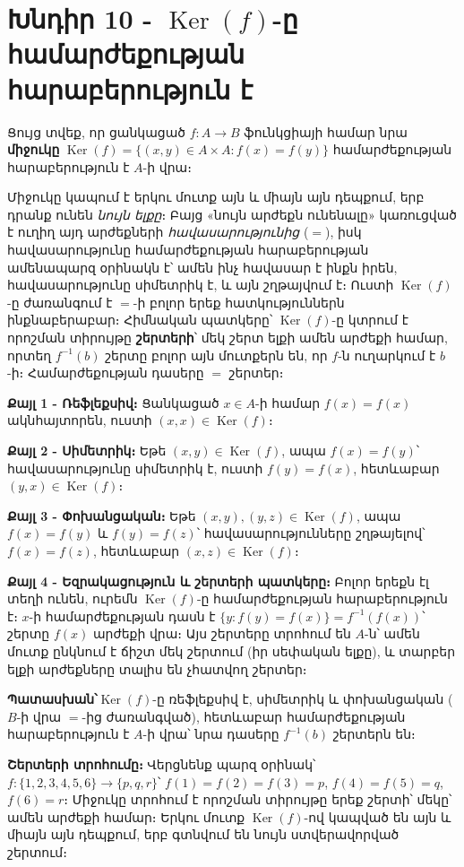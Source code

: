 \documentclass[11pt,a4paper]{article}
\DeclareMathOperator{\Ker}{Ker}
\newcommand{\answer}[1]{\begin{answerbox}\centering\textbf{Պատասխան՝}\quad #1\end{answerbox}}
\begin{document}
\section*{Խնդիր 10 - $\Ker(f)$-ը համարժեքության հարաբերություն է}

\begin{problembox}[10]
Ցույց տվեք, որ ցանկացած $f:A\to B$ ֆունկցիայի համար նրա \textbf{միջուկը}
$\Ker(f)=\{(x,y)\in A\times A: f(x)=f(y)\}$ համարժեքության հարաբերություն է $A$-ի վրա։
\end{problembox}

\begin{ideabox}
Միջուկը կապում է երկու մուտք այն և միայն այն դեպքում, երբ դրանք ունեն \emph{նույն ելքը}։ Բայց «նույն
արժեքն ունենալը» կառուցված է ուղիղ այդ արժեքների \emph{հավասարությունից} ($=$), իսկ հավասարությունը
համարժեքության հարաբերության ամենապարզ օրինակն է՝ ամեն ինչ հավասար է ինքն իրեն, հավասարությունը
սիմետրիկ է, և այն շղթայվում է։ Ուստի $\Ker(f)$-ը ժառանգում է $=$-ի բոլոր երեք հատկություններն
ինքնաբերաբար։ Հիմնական պատկերը՝ $\Ker(f)$-ը կտրում է որոշման տիրույթը \textbf{շերտերի}՝ մեկ շերտ ելքի
ամեն արժեքի համար, որտեղ $f^{-1}(b)$ շերտը բոլոր այն մուտքերն են, որ $f$-ն ուղարկում է $b$-ի։
Համարժեքության դասերը $=$ շերտեր։
\end{ideabox}

\textbf{Քայլ 1 - Ռեֆլեքսիվ։} Ցանկացած $x\in A$-ի համար $f(x)=f(x)$ ակնհայտորեն, ուստի $(x,x)\in\Ker(f)$։

\textbf{Քայլ 2 - Սիմետրիկ։} Եթե $(x,y)\in\Ker(f)$, ապա $f(x)=f(y)$՝ հավասարությունը սիմետրիկ է, ուստի
$f(y)=f(x)$, հետևաբար $(y,x)\in\Ker(f)$։

\textbf{Քայլ 3 - Փոխանցական։} Եթե $(x,y),(y,z)\in\Ker(f)$, ապա $f(x)=f(y)$ և $f(y)=f(z)$՝ հավասարությունները
շղթայելով՝ $f(x)=f(z)$, հետևաբար $(x,z)\in\Ker(f)$։

\textbf{Քայլ 4 - Եզրակացություն և շերտերի պատկերը։} Բոլոր երեքն էլ տեղի ունեն, ուրեմն $\Ker(f)$-ը
համարժեքության հարաբերություն է։ $x$-ի համարժեքության դասն է $\{y:f(y)=f(x)\}=f^{-1}(f(x))$՝ շերտը
$f(x)$ արժեքի վրա։ Այս շերտերը տրոհում են $A$-ն՝ ամեն մուտք ընկնում է ճիշտ մեկ շերտում (իր սեփական
ելքը), և տարբեր ելքի արժեքները տալիս են չհատվող շերտեր։

\answer{$\Ker(f)$-ը ռեֆլեքսիվ է, սիմետրիկ և փոխանցական ($B$-ի վրա $=$-ից ժառանգված), հետևաբար
համարժեքության հարաբերություն է $A$-ի վրա՝ նրա դասերը $f^{-1}(b)$ շերտերն են։}

\medskip
\textbf{Շերտերի տրոհումը։} Վերցնենք պարզ օրինակ՝ $f:\{1,2,3,4,5,6\}\to\{p,q,r\}$՝
$f(1)=f(2)=f(3)=p$, $f(4)=f(5)=q$, $f(6)=r$։ Միջուկը տրոհում է որոշման տիրույթը երեք շերտի՝
մեկը՝ ամեն արժեքի համար։ Երկու մուտք $\Ker(f)$-ով կապված են այն և միայն այն դեպքում, երբ գտնվում են
նույն ստվերավորված շերտում։
\end{document}
